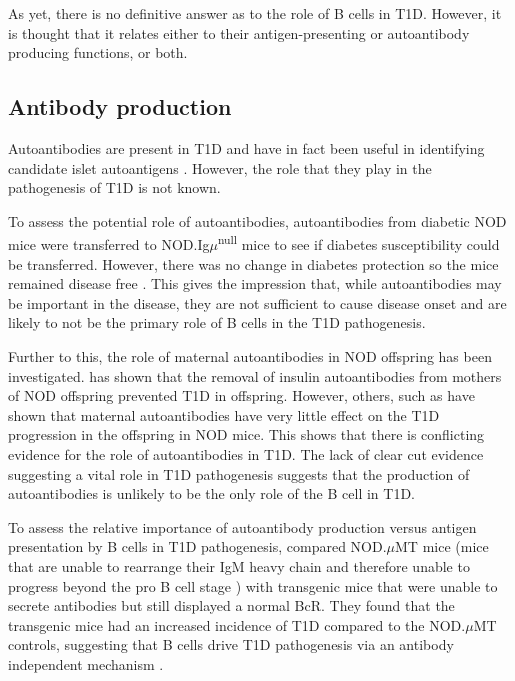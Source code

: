 As yet, there is no definitive answer as to the role of B cells in T1D.
However, it is thought that it relates either to their antigen-presenting or autoantibody producing functions, or both.

\subsection{Antibody production}

Autoantibodies are present in T1D and have in fact been useful in identifying candidate islet autoantigens \citep{Roep2012}.
However, the role that they play in the pathogenesis of T1D is not known.

To assess the potential role of autoantibodies, autoantibodies from diabetic NOD mice were transferred to NOD.Ig$\mu$\textsuperscript{null} mice to see if diabetes susceptibility could be transferred.
However, there was no change in diabetes protection so the mice remained disease free \citep{Serreze1998}.
This gives the impression that, while autoantibodies may be important in the disease, they are not sufficient to cause disease onset and are likely to not be the primary role of B cells in the T1D pathogenesis.

Further to this, the role of maternal autoantibodies in NOD offspring has been investigated.
\citet{Greeley2002} has shown that the removal of insulin autoantibodies from mothers of NOD offspring prevented T1D in offspring.
However, others, such as \citet{Koczwara2004nods} have shown that maternal autoantibodies have very little effect on the T1D progression in the offspring in NOD mice.
This shows that there is conflicting evidence for the role of autoantibodies in T1D.
The lack of clear cut evidence suggesting a vital role in T1D pathogenesis suggests that the production of autoantibodies is unlikely to be the only role of the B cell in T1D.

To assess the relative importance of autoantibody production versus antigen presentation by B cells in T1D pathogenesis, \citet{Wong2004} compared NOD.$\mu$MT mice (mice that are unable to rearrange their IgM heavy chain and therefore unable to progress beyond the pro B cell stage \citep{Kitamura1991}) with transgenic mice that were unable to secrete antibodies but still displayed a normal BcR.
They found that the transgenic mice had an increased incidence of T1D compared to the NOD.$\mu$MT controls, suggesting that B cells drive T1D pathogenesis via an antibody independent mechanism \citep{Wong2004}.



